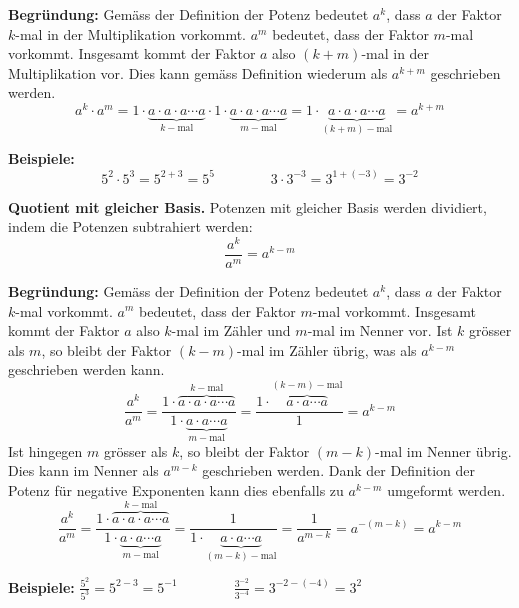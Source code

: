 \textbf{Begründung:} Gemäss der Definition der Potenz bedeutet $a^{k}$, dass $a$ der Faktor $k$-mal in der Multiplikation vorkommt. $a^{m}$ bedeutet, dass der Faktor $m$-mal vorkommt. Insgesamt kommt der Faktor $a$ also $(k+m)$-mal in der Multiplikation vor. Dies kann gemäss Definition wiederum als $a^{k+m}$ geschrieben werden.
\[
  a^{k}\cdot a^{m} = 1\cdot\underbrace{a\cdot a\cdot a\cdots a}_{k-\text{mal}}\cdot 1\cdot\underbrace{a\cdot a\cdot a\cdots a}_{m-\text{mal}} = 1\cdot\underbrace{a\cdot a\cdot a\cdots a}_{(k+m)-\text{mal}} = a^{k+m}
\]

\begin{example}
  \textbf{Beispiele:}
  \[
    5^{2}\cdot 5^{3} = 5^{2+3} = 5^{5} \qquad\qquad 3\cdot 3^{-3} = 3^{1+(-3)} = 3^{-2}
  \]
\end{example}
\vspace{1cm}

\begin{theorem}
  \textbf{Quotient mit gleicher Basis.} Potenzen mit gleicher Basis werden dividiert, indem die Potenzen subtrahiert werden:
  \[
    \frac{a^{k}}{a^{m}} = a^{k-m}
  \]
\end{theorem}

\textbf{Begründung:} Gemäss der Definition der Potenz bedeutet $a^{k}$, dass $a$ der Faktor $k$-mal vorkommt. $a^{m}$ bedeutet, dass der Faktor $m$-mal vorkommt. Insgesamt kommt der Faktor $a$ also $k$-mal im Zähler und $m$-mal im Nenner vor. Ist $k$ grösser als $m$, so bleibt der Faktor $(k-m)$-mal im Zähler übrig, was als $a^{k-m}$ geschrieben werden kann.
\[
  \frac{a^{k}}{a^{m}} = \frac{1\cdot\overbrace{a\cdot a\cdot a\cdots a}^{k-\text{mal}}}{1\cdot\underbrace{a\cdot a\cdots a}_{m-\text{mal}}} = \frac{1\cdot\overbrace{a\cdot a\cdots a}^{(k-m)-\text{mal}}}{1} = a^{k-m}
\]
Ist hingegen $m$ grösser als $k$, so bleibt der Faktor $(m-k)$-mal im Nenner übrig. Dies kann im Nenner als $a^{m-k}$ geschrieben werden. Dank der Definition der Potenz für negative Exponenten kann dies ebenfalls zu $a^{k-m}$ umgeformt werden.
\[
  \frac{a^{k}}{a^{m}} = \frac{1\cdot\overbrace{a\cdot a\cdot a\cdots a}^{k-\text{mal}}}{1\cdot\underbrace{a\cdot a\cdots a}_{m-\text{mal}}} = \frac{1}{1\cdot\underbrace{a\cdot a\cdots a}_{(m-k)-\text{mal}}} = \frac{1}{a^{m-k}} = a^{-(m-k)} = a^{k-m}
\]

\begin{example}
  \textbf{Beispiele:} $\displaystyle \frac{5^{2}}{5^{3}} = 5^{2-3} = 5^{-1} \qquad\qquad \frac{3^{-2}}{3^{-4}} = 3^{-2-(-4)} = 3^{2}$
\end{example}

